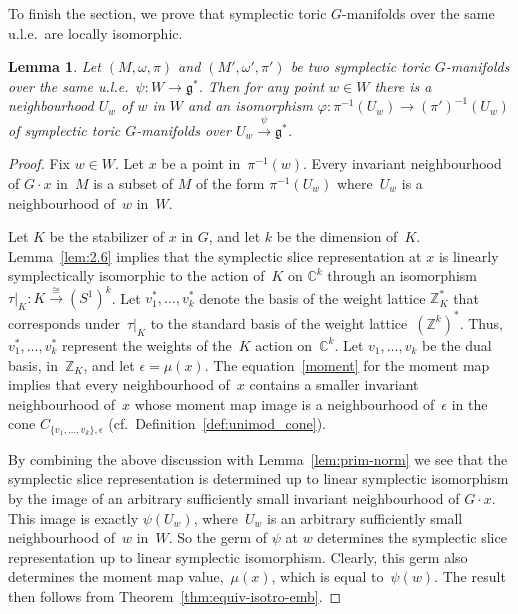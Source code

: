 \documentclass[pdftex]{sigma}
\numberwithin{equation}{section}
\newtheorem{Lemma}{Lemma}[section]
\begin{document}
To f\/inish the section, we prove that symplectic toric $G$-manifolds
over the same u.l.e.\ are locally isomorphic.

\begin{Lemma} \label{lem:loc-iso}
Let $(M, \omega, \pi)$
and $(M', \omega',  \pi')$
be two symplectic toric $G$-manifolds
over the same u.l.e.\ $\psi \colon W\to {\mathfrak g}^*$.
Then for any point $w \in W$
there is a neighbourhood $U_w$ of $w$ in $W$ and an isomorphism
$\varphi \colon \pi^{-1} (U_w) \to (\pi')^{-1} (U_w)$ of symplectic
toric $G$-manifolds over $U_w \stackrel{\psi}{\to}{\mathfrak g}^* $.
\end{Lemma}

\begin{proof}
Fix $w \in W$.
Let $x$ be a point in~$\pi^{-1}(w)$.
Every invariant neighbourhood of $G \cdot x$ in~$M$
is a subset of $M$ of the form $\pi^{-1}(U_w)$
where~$U_w$ is a neighbourhood of~$w$ in~$W$.

Let $K$ be the stabilizer of $x$ in $G$, and let $k$ be the dimension
of~$K$.  Lemma~\ref{lem:2.6} implies that the symplectic slice
representation at $x$ is linearly symplectically isomorphic to the
action of~$K$ on ${\mathbb C}^k$ through an isomorphism $\tau|_K \colon K
\stackrel{\cong}{\to} (S^1)^k$.  Let $v_1^*,\ldots,v_k^*$ denote the
basis of the weight lattice ${\mathbb Z}_K^*$ that corresponds under~$\tau|_K$
to the standard basis of the weight lattice~$({\mathbb Z}^k)^*$.  Thus,
$v_1^*,\ldots,v_k^*$ represent the weights of the~$K$ action on~${\mathbb C}^k$.  Let $v_1,\ldots,v_k$ be the dual basis, in~${\mathbb Z}_K$, and let
$\epsilon = \mu(x)$.  The equation~\eqref{moment} for the moment map
implies that every neighbourhood of~$x$ contains a smaller invariant
neighbourhood of~$x$ whose moment map image is a neighbourhood of~$\epsilon$ in the cone $C_{\{v_1,\ldots,v_k\},\epsilon}$ (cf.\
Def\/inition~\ref{def:unimod_cone}).

By combining the above discussion with  Lemma~\ref{lem:prim-norm} we see that
the symplectic slice representation is determined up to linear
symplectic isomorphism by the image of
an arbitrary suf\/f\/iciently small invariant neighbourhood of $G \cdot x$.
This image is exactly $\psi(U_w)$, where~$U_w$ is an arbitrary
suf\/f\/iciently small
neighbourhood of~$w$ in~$W$.  So the germ of $\psi$ at $w$ determines
the symplectic slice representation up to linear symplectic
isomorphism.  Clearly, this germ also determines the moment map value,~$\mu(x)$, which is equal to~$\psi(w)$.  The result then follows from
Theorem~\ref{thm:equiv-isotro-emb}.
\end{proof}
\end{document}
